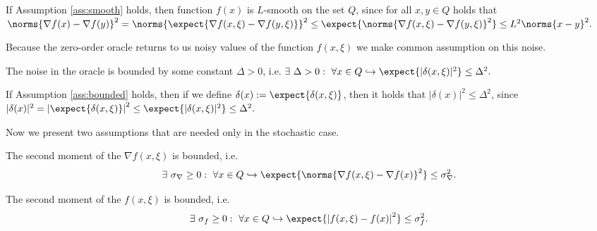         If Assumption \ref{ass:smooth} holds, then function $f(x)$ is $L$-smooth on the set $Q$, since for all $x, y \in Q$ holds that
        $
            \norms{\nabla f(x) - \nabla f(y)}^2 
            = 
            \norms{\expect{\nabla f(x, \xi) - \nabla f(y, \xi)}}^2 
            \leq \expect{\norms{\nabla f(x, \xi) - \nabla f(y, \xi)}^2} 
            \leq L^2 \norms{x - y}^2.
        $
        


        Because the zero-order oracle returns to us noisy values of the function $f(x, \xi)$ we make common assumption on this noise.
    
        \begin{assumption}\label{ass:bounded}
            The noise in the oracle is bounded by some constant $\Delta > 0$, i.e.
            $
                \exists~ \Delta > 0 : ~\forall x \in Q \hookrightarrow \expect{|\delta(x, \xi)|^2} \leq \Delta^2 .
            $
        \end{assumption}

        If Assumption \ref{ass:bounded} holds, then if we define $\delta(x) := \expect{\delta(x, \xi)}$, then it holds that $|\delta(x)|^2 \leq \Delta^2$, since
        $
            |\delta(x)|^2 = \left| \expect{\delta(x, \xi)} \right|^2 \leq \expect{|\delta(x, \xi)|^2} \leq \Delta^2.
        $


        Now we present two assumptions that are needed only in the stochastic case.
    
        \begin{assumption} \label{ass:sigma_nabla}
            The second moment of the $\nabla f(x, \xi)$ is bounded, i.e.
            \begin{equation*}
                \exists~ \sigma_{\nabla} \geq 0 : ~\forall x \in Q \hookrightarrow \expect{\norms{\nabla f(x, \xi) - \nabla f(x)}^2} \leq \sigma^2_{\nabla} .
            \end{equation*}
        \end{assumption}
    
        \begin{assumption} \label{ass:sigma_f}
            The second moment of the $f(x, \xi)$ is bounded, i.e.
            \begin{equation*}
                \exists~ \sigma_{f} \geq 0 : ~\forall x \in Q \hookrightarrow \expect{\left|f(x, \xi) - f(x) \right|^2} \leq \sigma^2_{f} .
            \end{equation*}
        \end{assumption}
    
